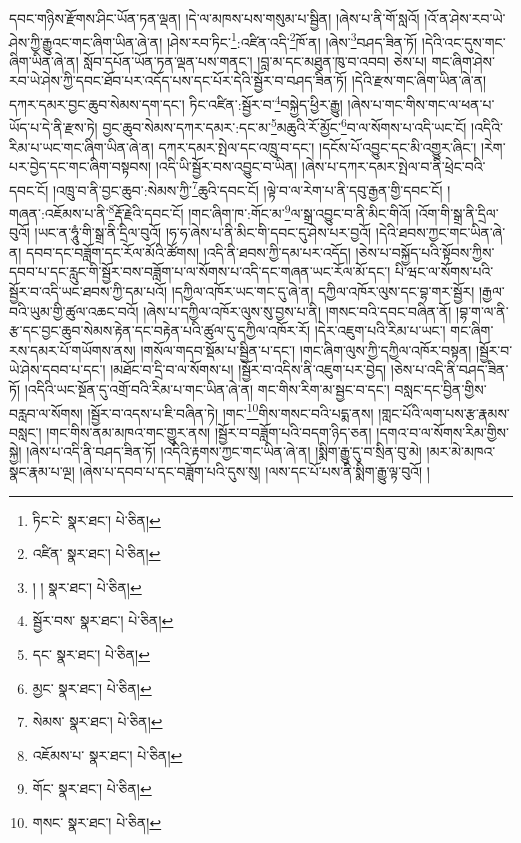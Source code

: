 དབང་གཉིས་རྫོགས་ཤིང་ཡོན་ཏན་ལྡན། །དེ་ལ་མཁས་པས་གསུམ་པ་སྦྱིན། །ཞེས་པ་ནི་གོ་སླའོ། །འོ་ན་ཤེས་རབ་ཡེ་ཤེས་ཀྱི་རྒྱུའང་གང་ཞིག་ཡིན་ཞེ་ན། །ཤེས་རབ་ཏིང་\footnote{ཏིང་ངེ་  སྣར་ཐང་།  པེ་ཅིན། }:འཛིན་འདི་\footnote{འཛིན་  སྣར་ཐང་།  པེ་ཅིན། }ཁོ་ན། །ཞེས་\footnote{། །  སྣར་ཐང་།  པེ་ཅིན། }བཤད་ཟིན་ཏོ། །དེའི་འང་དུས་གང་ཞིག་ཡིན་ཞེ་ན། སློབ་དཔོན་ཡོན་ཏན་ལྡན་པས་གནང་། །བླ་མ་དང་མཐུན་ཁུ་བ་འབབ། ཅེས་པ། གང་ཞིག་ཤེས་རབ་ཡེ་ཤེས་ཀྱི་དབང་ཐོབ་པར་འདོད་པས་དང་པོར་དེའི་སྦྱོར་བ་བཤད་ཟིན་ཏོ། །དེའི་རྫས་གང་ཞིག་ཡིན་ཞེ་ན། དཀར་དམར་བྱང་ཆུབ་སེམས་དག་དང་། ཏིང་འཛིན་:སྦྱོར་བ་\footnote{སྦྱོར་བས་  སྣར་ཐང་།  པེ་ཅིན། }བསྐྱེད་ཕྱིར་རྒྱུ། །ཞེས་པ་གང་གིས་གང་ལ་ཕན་པ་ཡོད་པ་དེ་ནི་རྫས་ཏེ། བྱང་ཆུབ་སེམས་དཀར་དམར་:དང་མ་\footnote{དང་  སྣར་ཐང་།  པེ་ཅིན། }མཆུའི་རོ་མྱོང་\footnote{མྱང་  སྣར་ཐང་།  པེ་ཅིན། }བ་ལ་སོགས་པ་འདི་ཡང་ངོ། །འདིའི་རིམ་པ་ཡང་གང་ཞིག་ཡིན་ཞེ་ན། དཀར་དམར་སྤེལ་དང་འཁྲུ་བ་དང་། །དངོས་པོ་འབྱུང་དང་མི་འགྱུར་ཞིང་། །རེག་པར་བྱེད་དང་གང་ཞིག་བསྟབས། །འདི་ཡི་སྦྱོར་བས་འབྱུང་བ་ཡིན། །ཞེས་པ་དཀར་དམར་སྤེལ་བ་ནི་ཕྲེང་བའི་དབང་ངོ། །འཁྲུ་བ་ནི་བྱང་ཆུབ་:སེམས་ཀྱི་\footnote{སེམས་  སྣར་ཐང་།  པེ་ཅིན། }ཆུའི་དབང་ངོ། །ལྟེ་བ་ལ་རེག་པ་ནི་དབུ་རྒྱན་གྱི་དབང་ངོ། །གཞན་:འཇོམས་པ་ནི་\footnote{འཇོམས་པ་  སྣར་ཐང་།  པེ་ཅིན། }རྡོ་རྗེའི་དབང་ངོ། །གང་ཞིག་ཁ་:གོང་མ་\footnote{གོང་  སྣར་ཐང་།  པེ་ཅིན། }ལ་སྒྲ་འབྱུང་བ་ནི་མིང་གིའོ། །འོག་གི་སྒྲ་ནི་དྲིལ་བུའོ། །ཡང་ན་ཧཱུཾ་གི་སྒྲ་ནི་དྲིལ་བུའོ། །ཧ་ཧ་ཞེས་པ་ནི་མིང་གི་དབང་དུ་ཤེས་པར་བྱའོ། །དེའི་ཐབས་ཀྱང་གང་ཡིན་ཞེ་ན། དབབ་དང་བཟློག་དང་རོལ་མོའི་ཚོགས། །འདི་ནི་ཐབས་ཀྱི་དམ་པར་འདོད། །ཅེས་པ་བསྐྱོད་པའི་སྟོབས་ཀྱིས་དབབ་པ་དང་རླུང་གི་སྦྱོར་བས་བཟློག་པ་ལ་སོགས་པ་འདི་དང་གཞན་ཡང་རོལ་མོ་དང་། པི་ཝང་ལ་སོགས་པའི་སྦྱོར་བ་འདི་ཡང་ཐབས་ཀྱི་དམ་པའོ། །དཀྱིལ་འཁོར་ཡང་གང་དུ་ཞེ་ན། དཀྱིལ་འཁོར་ལུས་དང་བྷ་གར་སྦྱོར། །རྒྱལ་བའི་ཡུམ་གྱི་ཚུལ་འཆང་བའོ། །ཞེས་པ་དཀྱིལ་འཁོར་ལུས་སུ་བྱས་པ་ནི། །གསང་བའི་དབང་བཞིན་ནོ། །བྷ་ག་ལ་ནི་རྩ་དང་བྱང་ཆུབ་སེམས་རྟེན་དང་བརྟེན་པའི་ཚུལ་དུ་དཀྱིལ་འཁོར་རོ། །དེར་འཇུག་པའི་རིམ་པ་ཡང་། གང་ཞིག་རས་དམར་པོ་གཡོགས་ནས། །གསོལ་གདབ་སྡོམ་པ་སྦྱིན་པ་དང་། །གང་ཞིག་ལུས་ཀྱི་དཀྱིལ་འཁོར་བསྟན། །སྦྱོར་བ་ཡེ་ཤེས་དབབ་པ་དང་། །མཐོང་བ་དྲི་བ་ལ་སོགས་པ། །སྦྱོར་བ་འདིས་ནི་འཇུག་པར་བྱེད། །ཅེས་པ་འདི་ནི་བཤད་ཟིན་ཏོ། །འདིའི་ཡང་སྔོན་དུ་འགྲོ་བའི་རིམ་པ་གང་ཡིན་ཞེ་ན། གང་གིས་རིག་མ་སྦྱང་བ་དང་། བསླང་དང་བྱིན་གྱིས་བརླབ་ལ་སོགས། །སྦྱོར་བ་འདས་པ་ཇི་བཞིན་ཏེ། །གང་\footnote{གསང་  སྣར་ཐང་།  པེ་ཅིན། }གིས་གསང་བའི་པདྨ་ནས། །གླང་པོའི་ལག་པས་རྩ་རྣམས་བསླང་། །གང་གིས་ནམ་མཁའ་གང་གྱུར་ནས། །སྦྱོར་བ་བཟློག་པའི་བདག་ཉིད་ཅན། །དགའ་བ་ལ་སོགས་རིམ་གྱིས་སྐྱེ། །ཞེས་པ་འདི་ནི་བཤད་ཟིན་ཏོ། །འདིའི་རྟགས་ཀྱང་གང་ཡིན་ཞེ་ན། །སྨིག་རྒྱུ་དུ་བ་སྲིན་བུ་མེ། །མར་མེ་མཁའ་སྣང་རྣམ་པ་ལྔ། །ཞེས་པ་དབབ་པ་དང་བཟློག་པའི་དུས་སུ། །ལས་དང་པོ་པས་ནི་སྨིག་རྒྱུ་ལྟ་བུའོ། །
